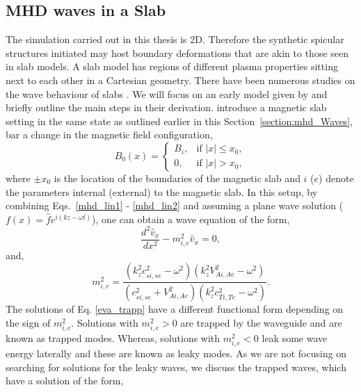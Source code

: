 \documentclass[12pt]{ociamthesis}
\newcommand{\eref}[1]{Eq. \eqref{#1}}
\begin{document}
\subsection{MHD waves in a Slab}
\label{section:Tan_I}
The simulation carried out in this thesis is 2D. Therefore the synthetic spicular structures initiated may host boundary deformations that are akin to those seen in slab models. A slab model has regions of different plasma properties sitting next to each other in a Cartesian geometry. There have been numerous studies on the wave behaviour of slabs \citep{Roberts1981SoPh6939R, Edwin1982SoPh76239E, Roberts1990IAUS142159R, Goossens1992SoPh138233G, Goossens2009AA503213G, Murawski2015AA577A126M, Allcock2017SoPh29235A, zsamberger2021ApJ906122Z}. We will focus on an early model given by \cite{Roberts1981SoPh6939R} and briefly outline the main steps in their derivation. \cite{Roberts1981SoPh6939R} introduce a magnetic slab setting in the same state as outlined earlier in this Section~\ref{section:mhd_Waves}, bar a change in the magnetic field configuration,
\begin{equation}
    B_0(x) = 
    \begin{cases}
      B_i, & \text{if } |x| \leq x_0, \\
      0, & \text{if } |x| > x_0,
    \end{cases}
\end{equation}
where $\pm x_0$ is the location of the boundaries of the magnetic slab and $i$ ($e$) denote the parameters internal (external) to the magnetic slab. In this setup, by combining Eqs.~\eqref{mhd_lin1} - \eqref{mhd_lin2} and assuming a plane wave solution ($f(x)=\hat{f} e^{i(kz-\omega t)}$), one can obtain a wave equation of the form,
\begin{equation}\label{eva_trapp}
    \frac{d^2 \hat{v}_x}{dx^2}-m^2_{i,e} \hat{v}_x = 0,
\end{equation}
and,
\begin{equation}
    m_{i,e}^2 = \frac{(k_z^2 c_{si,se}^2-\omega^2)(k_z^2 V_{Ai,Ae}^2-\omega^2)}{(c_{si,se}^2+V_{Ai,Ae}^2)(k_z^2 c_{Ti,Te}^2-\omega^2)}.
\end{equation}
The solutions of \eref{eva_trapp} have a different functional form depending on the sign of $m^2_{i,e}$. Solutions with $m^2_{i,e}>0$ are trapped by the waveguide and are known as trapped modes. Whereas, solutions with $m^2_{i,e}<0$ leak some wave energy laterally and these are known as leaky modes. As we are not focusing on searching for solutions for the leaky waves, we discuss the trapped waves, which have a solution of the form,
\end{document}
